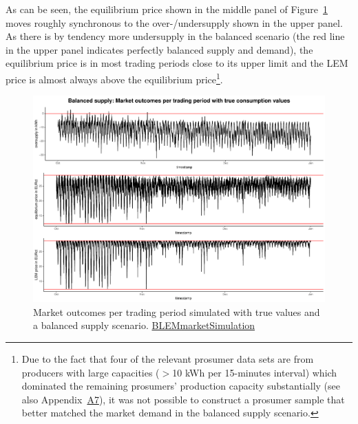 As can be seen, the equilibrium price shown in the middle panel of Figure~\ref{Fig:marketoutcomes_true_balanced} moves roughly synchronous to the over-/undersupply shown in the upper panel. As there is by tendency more undersupply in the balanced scenario (the red line in the upper panel indicates perfectly balanced supply and demand), the equilibrium price is in most trading periods close to its upper limit and the LEM price is almost always above the equilibrium price\footnote{Due to the fact that four of the relevant prosumer data sets are from producers with large capacities ($>$10 kWh per 15-minutes interval) which dominated the remaining prosumers' production capacity substantially (see also Appendix~\hyperlink{AppA7:Figures:producer_all}{A7}), it was not possible to construct a prosumer sample that better matched the market demand in the balanced supply scenario.}.
%
\begin{figure}[htp]
    \centering
    \includegraphics[width=\textwidth-1.1cm]{thesis/graphs/marketsimulation/marketoutcome_true_balanced.pdf}
    \caption[Market outcomes simulated with balanced supply and true values]{Market outcomes per trading period simulated with true values and a balanced supply scenario. \quantnet\href{https://github.com/QuantLet/BLEM/tree/master/BLEMmarketSimulation}{BLEMmarketSimulation}}
    \label{Fig:marketoutcomes_true_balanced}
\end{figure}
%

